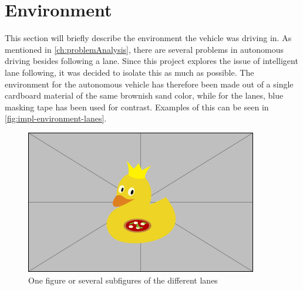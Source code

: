 \section{Environment}\label{sec:impl-environment}
This section will briefly describe the environment the vehicle was driving in.
As mentioned in \autoref{ch:problemAnalysis}, there are several problems in autonomous driving besides following a lane.
Since this project explores the issue of intelligent lane following, it was decided to isolate this as much as possible.
The environment for the autonomous vehicle has therefore been made out of a single cardboard material of the same brownish sand color, while for the lanes, blue masking tape has been used for contrast.
Examples of this can be seen in \autoref{fig:impl-environment-lanes}.

\begin{figure}[H]
    \centering
    \includegraphics[width=\textwidth]{images/example-image-duck}
    \caption{One figure or several subfigures of the different lanes}
    \label{fig:impl-environment-lanes}
\end{figure}

